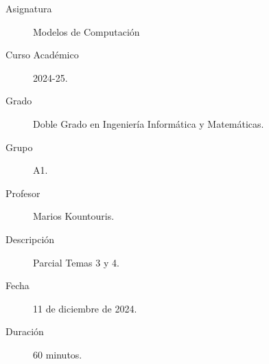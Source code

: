 \documentclass[12pt]{article}
\begin{document}

    
    

    \begin{description}
        \item[Asignatura] Modelos de Computación
        \item[Curso Académico] 2024-25.
        \item[Grado] Doble Grado en Ingeniería Informática y Matemáticas.
        \item[Grupo] A1.
        \item[Profesor] Marios Kountouris.
        \item[Descripción] Parcial Temas 3 y 4.
        \item[Fecha] 11 de diciembre de 2024.
        \item[Duración] 60 minutos.    
    \end{description}
    \newpage
\end{document}
